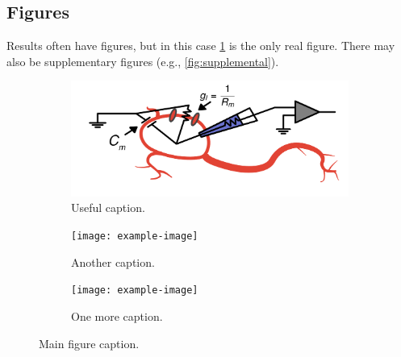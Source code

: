 \subsection{Figures}

Results often have figures, but in this case \cref{fig:real_fig} is the only
real figure. There may also be supplementary figures (e.g.,
\cref{fig:supplemental}).

\begin{figure}
    \begin{subfigure}{0.22\textwidth}
        \includegraphics{img/GIF_circuit.png}
        \caption{Useful caption.}
        \label{fig:real_fig}
    \end{subfigure}
    \begin{subfigure}{0.22\textwidth}
        \texttt{[image: example-image]}
        \caption{Another caption.}
    \end{subfigure}
    \begin{subfigure}{0.3\textwidth}
        \texttt{[image: example-image]}
        \caption{One more caption.}
    \end{subfigure}
    \caption{Main figure caption.}
\end{figure}


